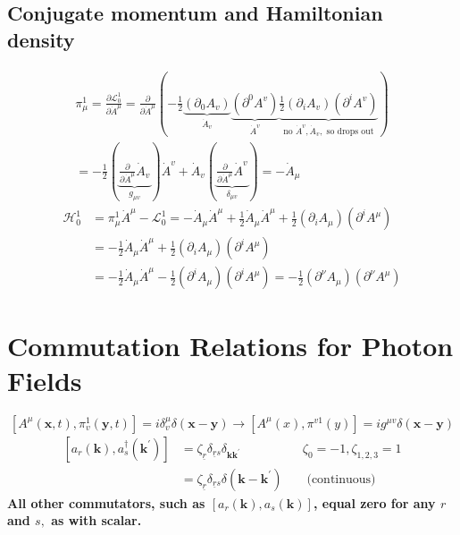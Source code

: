 \subsection{Conjugate momentum and Hamiltonian density}
\begin{equation}
\begin{array}{l}
{\pi_{\mu}^{1}=\frac{\partial \mathcal{L}_{0}^{1}}{\partial \dot{A}^{\mu}}=\frac{\partial}{\partial \dot{A}^{\mu}}\left(-\frac{1}{2} \underbrace{\left(\partial_{0} A_{v}\right)}_{\dot{A}_{v}} \underbrace{\left(\partial^{0} A^{v}\right)}_{\dot{A}^{v}} \underbrace{\frac{1}{2}\left(\partial_{i} A_{v}\right)\left(\partial^{i} A^{v}\right)}_{\text { no } \dot{A}^{v}, \dot{A}_{v}, \text { so drops out }}\right)}\\
{=-\frac{1}{2}(\underbrace{\frac{\partial}{\partial \dot{A}^{\mu}} \dot{A}_{v}}_{g_{\mu v}}) \dot{A}^{v}+\dot{A}_{v}(\underbrace{\frac{\partial}{\partial \dot{A}^{\mu}} \dot{A}^{v}}_{\delta_{\mu v}})=-\dot{A}_{\mu}}
\end{array}
\end{equation}
\begin{equation}
\begin{aligned}
\mathcal{H}_{0}^{1} &=\pi_{\mu}^{1} \dot{A}^{\mu}-\mathcal{L}_{0}^{1}=-\dot{A}_{\mu} \dot{A}^{\mu}+\frac{1}{2} \dot{A}_{\mu} \dot{A}^{\mu}+\frac{1}{2}\left(\partial_{i} A_{\mu}\right)\left(\partial^{i} A^{\mu}\right) \\
&=-\frac{1}{2} \dot{A}_{\mu} \dot{A}^{\mu}+\frac{1}{2}\left(\partial_{i} A_{\mu}\right)\left(\partial^{i} A^{\mu}\right)\\
&=-\frac{1}{2} \dot{A}_{\mu} \dot{A}^{\mu}-\frac{1}{2}\left(\partial^{i} A_{\mu}\right)\left(\partial^{i} A^{\mu}\right)=-\frac{1}{2}\left(\partial^{\nu} A_{\mu}\right)\left(\partial^{\nu} A^{\mu}\right)
\end{aligned}
\end{equation}
\section{Commutation Relations for Photon Fields}
\begin{equation}
\left[A^{\mu}(\mathbf{x}, t), \pi_{v}^{1}(\mathbf{y}, t)\right]=i \delta_{v}^{\mu} \delta(\mathbf{x}-\mathbf{y}) \rightarrow\left[A^{\mu}(x), \pi^{v 1}(y)\right]=i g^{\mu v} \delta(\mathbf{x}-\mathbf{y})
\end{equation}
\begin{equation}
\begin{aligned}
\left[a_{r}(\mathbf{k}), a_{s}^{\dagger}\left(\mathbf{k}^{\prime}\right)\right] &=\zeta_{\underline{r}} \delta_{\underline{r} s} \delta_{\mathbf{k k}^{\prime}} & & \zeta_{0}=-1, \zeta_{1,2,3}=1 \\
&=\zeta_{\underline{r}} \delta_{\underline{r}s} \delta\left(\mathbf{k}-\mathbf{k}^{\prime}\right) & & \text { (continuous) }
\end{aligned}
\end{equation}
\textbf{All other commutators, such as $\left[a_{r}(\mathbf{k}), a_{s}(\mathbf{k})\right]$, equal zero for any $r$ and $s,$ as with scalar.}
